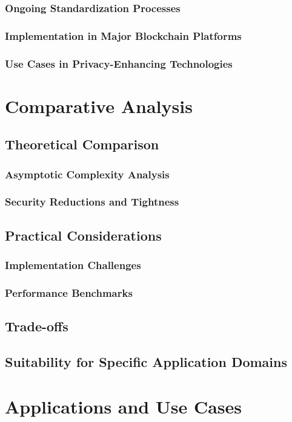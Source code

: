\documentclass{iacrtrans}
\begin{document}
\subsubsection{Ongoing Standardization Processes}
\subsubsection{Implementation in Major Blockchain Platforms}
\subsubsection{Use Cases in Privacy-Enhancing Technologies}

\section{Comparative Analysis}
\subsection{Theoretical Comparison}
\subsubsection{Asymptotic Complexity Analysis}
\subsubsection{Security Reductions and Tightness}
\subsection{Practical Considerations}
\subsubsection{Implementation Challenges}
\subsubsection{Performance Benchmarks}
\subsection{Trade-offs}
\subsection{Suitability for Specific Application Domains}

\section{Applications and Use Cases}
\end{document}
